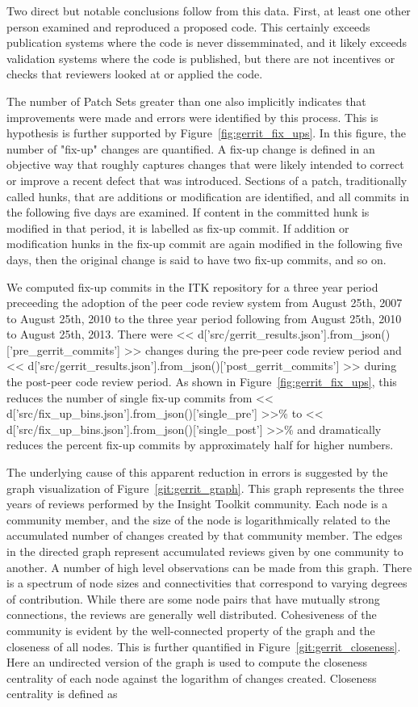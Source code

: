 \documentclass{frontiersENG} %
\begin{document}
Two direct but notable conclusions follow from this data. First, at least one
other person examined and reproduced a proposed code.  This certainly exceeds
publication systems where the code is never dissemminated, and it likely
exceeds validation systems where the code is published, but there are not
incentives or checks that reviewers looked at or applied the code.

The number of Patch Sets greater than one also implicitly indicates that
improvements were made and errors were identified by this process.  This is
hypothesis is further supported by Figure~\ref{fig:gerrit_fix_ups}.  In this
figure, the number of "fix-up" changes are quantified. A fix-up change is
defined in an objective way that roughly captures changes that were likely
intended to correct or improve a recent defect that was introduced.  Sections
of a patch, traditionally called hunks, that are additions or modification are
identified, and all commits in the following five days are examined.  If
content in the committed hunk is modified in that period, it is labelled as
fix-up commit.  If addition or modification hunks in the fix-up commit are again
modified in the following five days, then the original change is said to have
two fix-up commits, and so on.

We computed fix-up commits in the ITK repository for a three year period
preceeding the adoption of the peer code review system from August 25th, 2007
to August 25th, 2010 to the three year period following from August 25th, 2010
to August 25th, 2013.  There were
<< d['src/gerrit_results.json'].from_json()['pre_gerrit_commits'] >>
changes during the pre-peer code review period and
<< d['src/gerrit_results.json'].from_json()['post_gerrit_commits'] >>
during the post-peer code review period.  As shown in
Figure~\ref{fig:gerrit_fix_ups}, this reduces the number of
single fix-up commits from <<
d['src/fix_up_bins.json'].from_json()['single_pre'] >>\%
to << d['src/fix_up_bins.json'].from_json()['single_post'] >>\% and
dramatically reduces the percent fix-up commits by approximately half for
higher numbers.

The underlying cause of this apparent reduction in errors is suggested by the
graph visualization of Figure~\ref{git:gerrit_graph}. This graph represents
the three years of reviews performed by the Insight Toolkit community. Each
node is a community member, and the size of the node is logarithmically
related to the accumulated number of changes created by that community member.
The edges in the directed graph represent accumulated reviews given by one
community to another. A number of high level observations can be made from
this graph.  There is a spectrum of node sizes and connectivities that
correspond to varying degrees of contribution. While there are some node pairs
that have mutually strong connections, the reviews are generally well
distributed.  Cohesiveness of the community is evident by the well-connected
property of the graph and the closeness of all nodes.  This is further
quantified in Figure~\ref{git:gerrit_closeness}.  Here an undirected version
of the graph is used to compute the closeness centrality of each node against
the logarithm of changes created.  Closeness centrality is defined
as\cite{Freeman1979}
\end{document}
